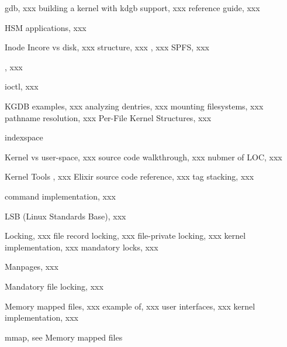 \begin{theindex}
\indexspace
	 \item gdb, xxx
	 	\subitem building a kernel with kdgb support, xxx
		\subitem reference guide, xxx

\indexspace
	 \item HSM applications, xxx

\indexspace
	 \item Inode
		\subitem Incore vs disk, xxx
		\subitem {} structure, xxx
		\subitem {}, xxx
		\subitem SPFS, xxx

\indexspace
	 \item {}, xxx
	 
\indexspace
	 \item ioctl, xxx

\indexspace
	 \item KGDB examples, xxx
		\subitem analyzing dentries, xxx
		\subitem mounting filesystems, xxx
	 	\subitem pathname resolution, xxx
		\subitem Per-File Kernel Structures, xxx
 
 indexspace
	 \item Kernel 
		\subitem vs user-space, xxx
		\subitem source code walkthrough, xxx
		\subitem nubmer of LOC, xxx

\indexspace
	 \item Kernel Tools
	\subitem {}, xxx
	\subitem Elixir source code reference, xxx
	\subitem {} tag stacking, xxx
	
\indexspace
	 \item {} command implementation, xxx

\indexspace
	 \item LSB (Linux Standards Base), xxx

\indexspace
	 \item Locking, xxx
	 	\subitem file record locking, xxx
		\subitem file-private locking, xxx
		\subitem kernel implementation, xxx
		\subitem mandatory locks, xxx

\indexspace
	 \item Manpages, xxx

\indexspace
	 \item Mandatory file locking, xxx
	 
\indexspace
	 \item Memory mapped files, xxx
	 	\subitem example of, xxx
	 	\subitem user interfaces, xxx
		\subitem kernel implementation, xxx
	 
\indexspace
	 \item mmap, see Memory mapped files


\end{theindex}
